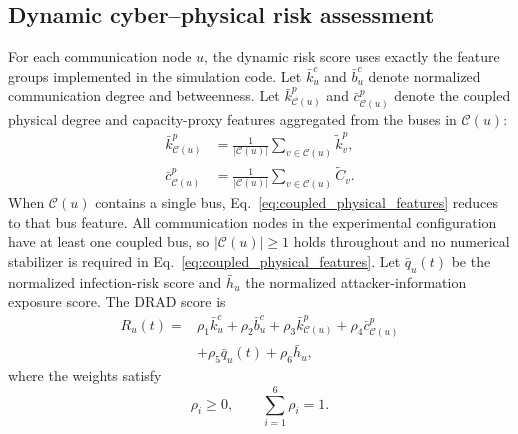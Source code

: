 \documentclass[lettersize,journal]{IEEEtran}
\begin{document}
\subsection{Dynamic cyber--physical risk assessment}
\label{subsec:dynamic_risk}

For each communication node $u$, the dynamic risk score uses exactly the feature groups implemented in the simulation code. Let $\bar{k}_u^{c}$ and $\bar{b}_u^{c}$ denote normalized communication degree and betweenness. Let $\bar{k}_{\mathcal{C}(u)}^{p}$ and $\bar{c}_{\mathcal{C}(u)}^{p}$ denote the coupled physical degree and capacity-proxy features aggregated from the buses in $\mathcal{C}(u)$:
\begin{equation}
\begin{aligned}
    \bar{k}_{\mathcal{C}(u)}^{p}
    &=
    \frac{1}{|\mathcal{C}(u)|}
    \sum_{v\in\mathcal{C}(u)}\widetilde{k}^{p}_{v},\\
    \bar{c}_{\mathcal{C}(u)}^{p}
    &=
    \frac{1}{|\mathcal{C}(u)|}
    \sum_{v\in\mathcal{C}(u)}\widetilde{C}_{v}.
\end{aligned}
    \label{eq:coupled_physical_features}
\end{equation}
When $\mathcal{C}(u)$ contains a single bus, Eq.~\eqref{eq:coupled_physical_features} reduces to that bus feature. All communication nodes in the experimental configuration have at least one coupled bus, so $|\mathcal{C}(u)|\geq 1$ holds throughout and no numerical stabilizer is required in Eq.~\eqref{eq:coupled_physical_features}. Let $\bar{q}_u(t)$ be the normalized infection-risk score and $\bar{h}_u$ the normalized attacker-information exposure score. The DRAD score is
\begin{equation}
\begin{aligned}
    R_u(t)
    =
    &\rho_1 \bar{k}_u^{c}
    +\rho_2 \bar{b}_u^{c}
    +\rho_3 \bar{k}_{\mathcal{C}(u)}^{p}
    +\rho_4 \bar{c}_{\mathcal{C}(u)}^{p} \\
    &+\rho_5 \bar{q}_u(t)
    +\rho_6 \bar{h}_u ,
\end{aligned}
    \label{eq:dynamic_risk_score}
\end{equation}
where the weights satisfy
\begin{equation}
    \rho_i\geq0,\qquad
    \sum_{i=1}^{6}\rho_i=1.
    \label{eq:risk_weight_constraint}
\end{equation}
\end{document}
